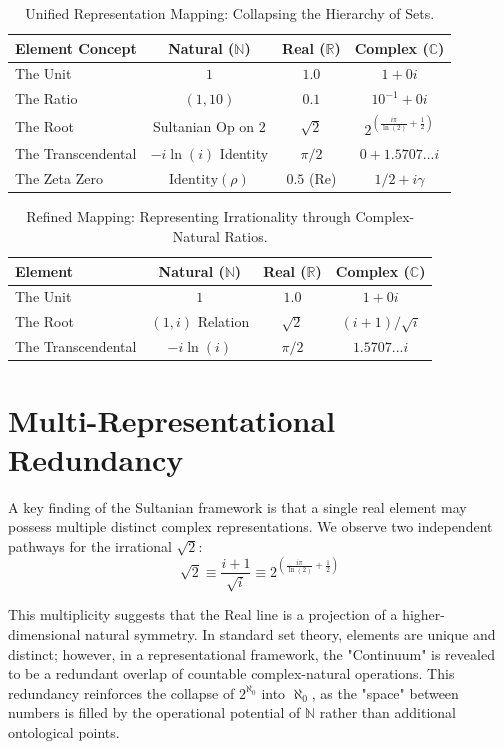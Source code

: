 \documentclass[12pt,a4paper]{article}
\begin{document}
\begin{table}[htbp]
\centering
\begin{tabular}{|l|c|c|c|}
\hline
\textbf{Element Concept} & \textbf{Natural ($\mathbb{N}$)} & \textbf{Real ($\mathbb{R}$)} & \textbf{Complex ($\mathbb{C}$)} \\ \hline
The Unit & $1$ & $1.0$ & $1 + 0i$ \\ \hline
The Ratio & $(1, 10)$ & $0.1$ & $10^{-1} + 0i$ \\ \hline
The Root & Sultanian Op on $2$ & $\sqrt{2}$ & $2^{(\frac{i\pi}{\ln(2)} + \frac{1}{2})}$ \\ \hline
The Transcendental & $-i \ln(i)$ Identity & $\pi/2$ & $0 + 1.5707...i$ \\ \hline
The Zeta Zero & $\text{Identity}(\rho)$ & $0.5$ (Re) & $1/2 + i\gamma$ \\ \hline
\end{tabular}
\caption{Unified Representation Mapping: Collapsing the Hierarchy of Sets.}
\label{table:mappings}
\end{table}

\begin{table}[htbp]
\centering
\begin{tabular}{|l|c|c|c|}
\hline
\textbf{Element} & \textbf{Natural ($\mathbb{N}$)} & \textbf{Real ($\mathbb{R}$)} & \textbf{Complex ($\mathbb{C}$)} \\ \hline
The Unit & $1$ & $1.0$ & $1 + 0i$ \\ \hline
The Root & $(1, i)$ Relation & $\sqrt{2}$ & $(i+1)/\sqrt{i}$ \\ \hline
The Transcendental & $-i \ln(i)$ & $\pi/2$ & $1.5707...i$ \\ \hline
\end{tabular}
\caption{Refined Mapping: Representing Irrationality through Complex-Natural Ratios.}
\end{table}
\section{Multi-Representational Redundancy}
A key finding of the Sultanian framework is that a single real element may possess multiple distinct complex representations. We observe two independent pathways for the irrational $\sqrt{2}$:
\begin{equation}
    \sqrt{2} \equiv \frac{i+1}{\sqrt{i}} \equiv 2^{\left(\frac{i \pi}{\ln(2)} + \frac{1}{2}\right)}
\end{equation}

This multiplicity suggests that the Real line is a projection of a higher-dimensional natural symmetry. In standard set theory, elements are unique and distinct; however, in a representational framework, the "Continuum" is revealed to be a redundant overlap of countable complex-natural operations. This redundancy reinforces the collapse of $2^{\aleph_0}$ into $\aleph_0$, as the "space" between numbers is filled by the operational potential of $\mathbb{N}$ rather than additional ontological points.
\end{document}
